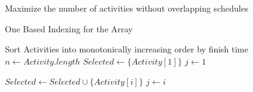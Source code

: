 \documentclass[12pt]{article}
\begin{document}
\begin{algorithm}

  \caption{Maximize the number of activities without overlapping schedules}
  \begin{algorithmic}[1]
    \Ensure One Based Indexing for the Array
    \Statex

        \Statex
        
        \State Sort Activities into monotonically increasing order by finish time
        \State $n \gets Activity.length$
        \State $Selected \gets \{Activity[1]\}$  
        \State $j \gets 1$ 

                \State $Selected \gets Selected  \cup \{Activity[i]\} $
                \State $j \gets i$
                
            \EndIf
        \EndFor
        
        \Statex
        \State {}
            
    \EndFunction
  \end{algorithmic}
  
\end{algorithm}
\end{document}
